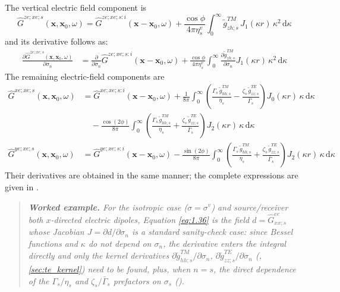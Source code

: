 \documentclass[12pt]{report}
\begin{document}
The vertical electric field component is
\begin{equation}
    \hat{G}^{ze;xe;s}(\mathbf{x},\mathbf{x}_0,\omega)
    = \hat{G}^{ze;xe;s:i}(\mathbf{x}-\mathbf{x}_0,\omega)
    + \frac{\cos\phi}{4\pi\eta^v_s}
      \int_{0}^{\infty} \tilde{g}^{TM}_{zh;s}\,J_1(\kappa r)\,\kappa^2\,\mathrm{d}\kappa
    \label{eq:1.34}
\end{equation}
and its derivative follows as:
\begin{align}
    \frac{\partial \hat{G}^{ze;xe;s}(\mathbf{x},\mathbf{x}_0,\omega)}{\partial \sigma_n}
    &= \frac{\partial}{\partial \sigma_n}\hat{G}^{ze;xe;s:i}(\mathbf{x}-\mathbf{x}_0,\omega)
     + \frac{\cos\phi}{4\pi\eta^v_s}
       \int_{0}^{\infty}
         \frac{\partial \tilde{g}^{TM}_{zh;s}}{\partial \sigma_n}
         J_1(\kappa r)\,\kappa^2\,\mathrm{d}\kappa
    \label{eq:1.35}
\end{align}
The remaining electric-field components are
\begin{align}
    \hat{G}^{xe;xe;s}(\mathbf{x},\mathbf{x}_0,\omega)
    &= \hat{G}^{xe;xe;s:i}(\mathbf{x}-\mathbf{x}_0,\omega)
     + \frac{1}{8\pi}
       \int_{0}^{\infty}\!
         \left(\frac{\Gamma_s\,\tilde{g}^{TM}_{hh;s}}{\eta_s}
              -\frac{\zeta_s\,\tilde{g}^{TE}_{zz;s}}{\bar{\Gamma}_s}\right)
         J_0(\kappa r)\,\kappa\,\mathrm{d}\kappa \nonumber \\
    &\quad
     - \frac{\cos(2\phi)}{8\pi}
       \int_{0}^{\infty}\!
         \left(\frac{\Gamma_s\,\tilde{g}^{TM}_{hh;s}}{\eta_s}
              +\frac{\zeta_s\,\tilde{g}^{TE}_{zz;s}}{\bar{\Gamma}_s}\right)
         J_2(\kappa r)\,\kappa\,\mathrm{d}\kappa
    \label{eq:1.36} \\
    \hat{G}^{ye;xe;s}(\mathbf{x},\mathbf{x}_0,\omega)
    &= \hat{G}^{ye;xe;s:i}(\mathbf{x}-\mathbf{x}_0,\omega)
     - \frac{\sin(2\phi)}{8\pi}
       \int_{0}^{\infty}\!
         \left(\frac{\Gamma_s\,\tilde{g}^{TM}_{hh;s}}{\eta_s}
              +\frac{\zeta_s\,\tilde{g}^{TE}_{zz;s}}{\bar{\Gamma}_s}\right)
         J_2(\kappa r)\,\kappa\,\mathrm{d}\kappa
    \label{eq:1.37}
\end{align}
Their derivatives are obtained in the same manner; the complete
expressions are given in .

\begin{quote}
\small\itshape
\textbf{Worked example.} For the isotropic case (\(\sigma=\sigma^v\)) and
source/receiver both \(x\)-directed electric dipoles, Equation
\eqref{eq:1.36} is the field \(d = \hat G^{ee}_{xx;s}\) whose Jacobian
\(J=\partial d/\partial\sigma_n\) is a standard sanity-check case: since
Bessel functions and \(\kappa\) do not depend on \(\sigma_n\), the
derivative enters the integral directly and only the kernel derivatives
\(\partial\tilde g^{TM}_{hh;s}/\partial\sigma_n\),
\(\partial\tilde g^{TE}_{zz;s}/\partial\sigma_n\)
(, \ref{sec:te_kernel}) need to be found, plus, when
\(n=s\), the direct dependence of the \(\Gamma_s/\eta_s\) and
\(\zeta_s/\bar\Gamma_s\) prefactors on \(\sigma_s\)
().
\end{quote}
\end{document}
